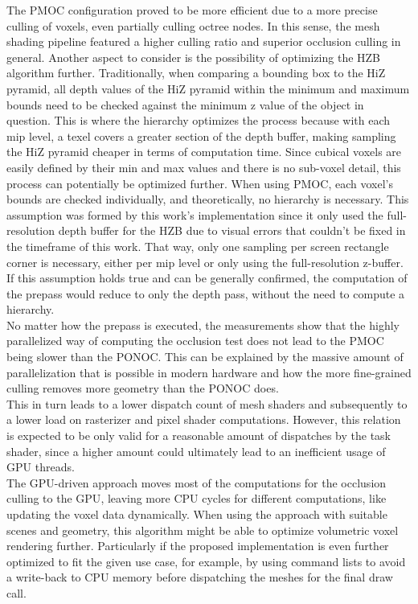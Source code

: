 \noindent
The \ac{PMOC} configuration proved to be more efficient due to a more precise culling of voxels, even partially 
culling octree nodes. In this sense, the mesh shading pipeline featured a higher culling ratio and superior occlusion 
culling in general. Another aspect to consider is the possibility of optimizing the \ac{HZB} algorithm further. 
Traditionally, when comparing a bounding box to the \ac{HiZ} pyramid, all depth values of the \ac{HiZ} pyramid within the 
minimum and maximum bounds need to be checked against the minimum z value of the object in question. This is where the 
hierarchy optimizes the process because with each mip level, a texel covers a greater section of the depth buffer, making 
sampling the \ac{HiZ} pyramid cheaper in terms of computation time. Since cubical voxels are easily defined by their min 
and max values and there is no sub-voxel detail, this process can potentially be optimized further. When using \ac{PMOC}, each voxel's bounds are checked individually, and theoretically, no hierarchy is necessary. This assumption was 
formed by this work's implementation since it only used the full-resolution depth buffer for the \ac{HZB} due to visual 
errors that couldn't be fixed in the timeframe of this work. That way, only one sampling per screen rectangle corner is 
necessary, either per mip level or only using the full-resolution z-buffer. If this assumption holds true and can be 
generally confirmed, the computation of the prepass would reduce to only the depth pass, without the need to compute a 
hierarchy. \\

\noindent
No matter how the prepass is executed, the measurements show that the highly parallelized way of computing the occlusion 
test does not lead to the \ac{PMOC} being slower than the \ac{PONOC}. This can be explained by the 
massive amount of parallelization that is possible in modern hardware and how the more fine-grained culling removes more 
geometry than the \ac{PONOC} does. \\

\noindent
This in turn leads to a lower dispatch count of mesh shaders and 
subsequently to a lower load on rasterizer and pixel shader computations. However, this relation is expected to be only 
valid for a reasonable amount of dispatches by the task shader, since a higher amount could ultimately lead to an 
inefficient usage of \ac{GPU} threads. \\

\noindent
The \ac{GPU}-driven approach moves most of the computations for the occlusion culling to the \ac{GPU}, leaving more 
\ac{CPU} cycles for different computations, like updating the voxel data dynamically. When using the approach with 
suitable scenes and geometry, this algorithm might be able to optimize volumetric voxel rendering further. Particularly 
if the proposed implementation is even further optimized to fit the given use case, for example, by using command lists 
to avoid a write-back to \ac{CPU} memory before dispatching the meshes for the final draw call. \\

